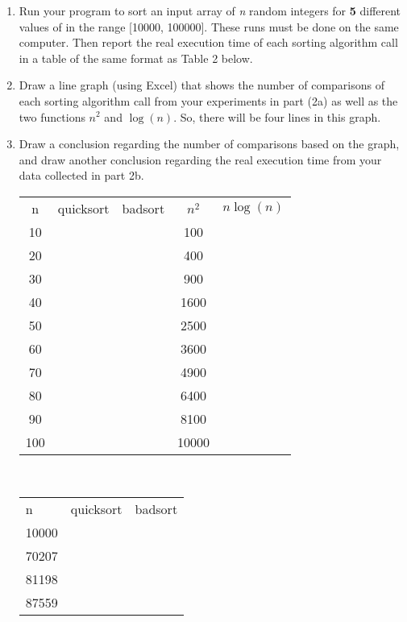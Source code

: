 \begin{enumerate}
\begin{enumerate}
  \item Run your program to sort an input array of \emph{n} random integers for \textbf{5} different values of in the range [10000, 100000]. These runs must be done on the same computer. Then report the real execution time of each sorting algorithm call in a table of the same format as Table 2 below.
  \item Draw a line graph (using Excel) that shows the number of comparisons of each sorting
algorithm call from your experiments in part (2a) as well as the two functions $n^{2}$ and $\log{(n)}$. So, there will be four lines in this graph.
  \item Draw a conclusion regarding the number of comparisons based on the graph, and draw another conclusion regarding the real execution time from your data collected in part 2b. \\
  \begin{tabular}{c c c c c}\\\hline
  n & quicksort & badsort & $n^{2}$ & $n\log{(n)}$ \\
 10 &           &         & 100     &              \\
 20 &           &         & 400     &              \\
 30 &           &         & 900     &              \\
 40 &           &         & 1600    &              \\
 50 &           &         & 2500    &              \\
 60 &           &         & 3600    &              \\
 70 &           &         & 4900    &              \\
 80 &           &         & 6400    &              \\
 90 &           &         & 8100    &              \\
100 &           &         & 10000   &              \\
  \end{tabular}\\
  \begin{tabular}{l l l}\\\hline
  n   & quicksort & badsort \\
10000 &           &         \\
70207 &           &         \\
81198 &           &         \\
87559 &           &         \\

\end{tabular}
\end{enumerate}
\end{enumerate}
